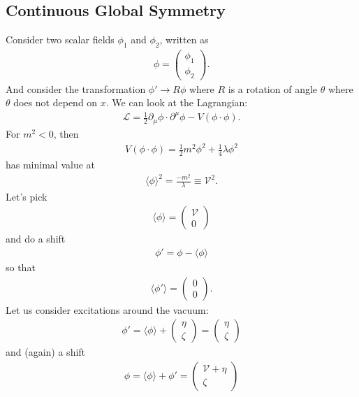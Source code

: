 \documentclass[a4paper,11pt]{article}
\numberwithin{equation}{section}
\theoremstyle{definition}
\newcommand{\p}{\partial}
\newcommand{\lag}{\mathcal{L}}
\begin{document}
\subsection{Continuous Global Symmetry}
Consider two scalar fields $\phi_1$ and $\phi_2$, written as
\begin{align}
\phi = \begin{pmatrix}
\phi_1 \\ \phi_2
\end{pmatrix}.
\end{align}
And consider the transformation $\phi' \to R\phi$ where $R$ is a rotation of angle $\theta$ where $\theta$ does not depend on $x$. We can look at the Lagrangian:
\begin{align}
\lag = \frac{1}{2}\p_\mu \phi \cdot \p^\mu \phi - V(\phi \cdot \phi).
\end{align}
For $m^2 < 0$, then 
\begin{align}
V(\phi\cdot \phi) = \frac{1}{2}m^2 \phi^2 + \frac{1}{4}\lambda\phi^2
\end{align}
has minimal value at
\begin{align}
\langle \phi \rangle^2 = \frac{-m^2}{\lambda} \equiv \mathcal{V}^2.
\end{align}
Let's pick 
\begin{align}
\langle \phi \rangle = \begin{pmatrix}
\mathcal{V}\\0
\end{pmatrix}
\end{align}
and do a shift
\begin{align}
\phi' = \phi - \langle \phi \rangle
\end{align}
so that 
\begin{align}
\langle \phi' \rangle = \begin{pmatrix}
0\\0
\end{pmatrix}.
\end{align}
Let us consider excitations around the vacuum:
\begin{align}
\phi' = \langle \phi \rangle + \begin{pmatrix}
\eta \\\zeta
\end{pmatrix} = \begin{pmatrix}
\eta \\ \zeta
\end{pmatrix}
\end{align}
and (again) a shift
\begin{align}
\phi = \langle \phi  \rangle + \phi' = \begin{pmatrix}
\mathcal{V} + \eta \\ \zeta 
\end{pmatrix}
\end{align}
\end{document}
